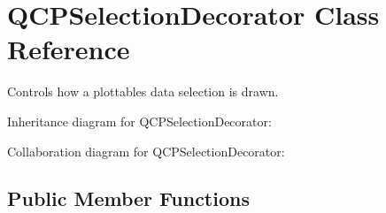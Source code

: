 \hypertarget{classQCPSelectionDecorator}{}\section{Q\+C\+P\+Selection\+Decorator Class Reference}
\label{classQCPSelectionDecorator}


Controls how a plottable\textquotesingle{}s data selection is drawn.  




Inheritance diagram for Q\+C\+P\+Selection\+Decorator\+:


Collaboration diagram for Q\+C\+P\+Selection\+Decorator\+:
\subsection*{Public Member Functions}
